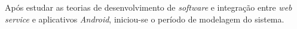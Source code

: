 
	\par Após estudar as teorias de desenvolvimento de \textit{software} e
integração entre \textit{web service} e aplicativos \textit{Android},
iniciou-se o período de modelagem do sistema.
